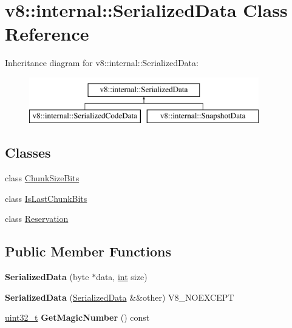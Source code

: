 \hypertarget{classv8_1_1internal_1_1SerializedData}{}\section{v8\+:\+:internal\+:\+:Serialized\+Data Class Reference}
\label{classv8_1_1internal_1_1SerializedData}
Inheritance diagram for v8\+:\+:internal\+:\+:Serialized\+Data\+:\begin{figure}[H]
\begin{center}
\leavevmode
\includegraphics[height=2.000000cm]{classv8_1_1internal_1_1SerializedData}
\end{center}
\end{figure}
\subsection*{Classes}
\begin{DoxyCompactItemize}
\item 
class \mbox{\hyperlink{classv8_1_1internal_1_1SerializedData_1_1ChunkSizeBits}{Chunk\+Size\+Bits}}
\item 
class \mbox{\hyperlink{classv8_1_1internal_1_1SerializedData_1_1IsLastChunkBits}{Is\+Last\+Chunk\+Bits}}
\item 
class \mbox{\hyperlink{classv8_1_1internal_1_1SerializedData_1_1Reservation}{Reservation}}
\end{DoxyCompactItemize}
\subsection*{Public Member Functions}
\begin{DoxyCompactItemize}
\item 
\mbox{\label{classv8_1_1internal_1_1SerializedData_a742e9fe1c13ef44ebe723558a9b33326}} 
{\bfseries Serialized\+Data} (byte $\ast$data, \mbox{\hyperlink{classint}{int}} size)
\item 
\mbox{\label{classv8_1_1internal_1_1SerializedData_ac323e284ade2900d78063b7b3376af11}} 
{\bfseries Serialized\+Data} (\mbox{\hyperlink{classv8_1_1internal_1_1SerializedData}{Serialized\+Data}} \&\&other) V8\+\_\+\+N\+O\+E\+X\+C\+E\+PT
\item 
\mbox{\label{classv8_1_1internal_1_1SerializedData_af56746b809447cca365e385c42388b49}} 
\mbox{\hyperlink{classuint32__t}{uint32\+\_\+t}} {\bfseries Get\+Magic\+Number} () const
\end{DoxyCompactItemize}
